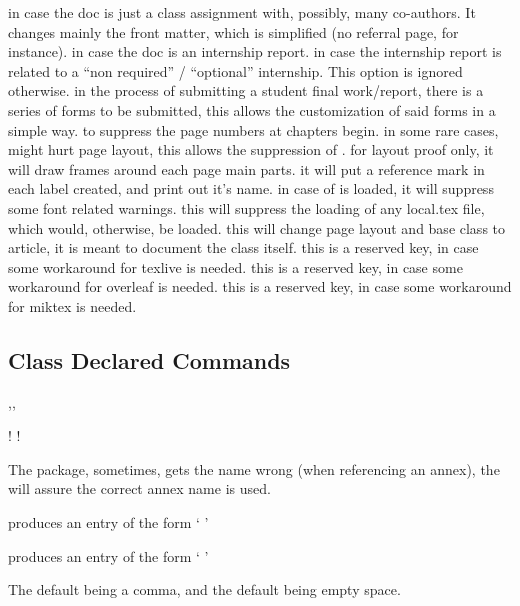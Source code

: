 \documentclass[dctools,english,tocdepth=3,secdepth=3]{ufrgscca} %
\begin{document}
\begin{Options}
	 in case the doc is just a class assignment with, possibly, many co-authors. It changes mainly the front matter, which is simplified (no referral page, for instance).
	 in case the doc is an internship report.
	 in case the internship report is related to a “non required” / “optional” internship. This option is ignored otherwise.
	 in the process of submitting a student final work/report, there is a series of forms to be submitted, this allows the customization  of said forms in a simple  way.
	 to suppress the page numbers at chapters begin.
	 in some rare cases,  might hurt page layout, this allows the suppression of .
	 for layout proof only, it will draw frames around each page main parts.
	 it will put a reference mark in each label created, and print out it's name.
	 in case of  is loaded, it will suppress some font related warnings.
	 this will suppress the loading of any local.tex file, which would, otherwise, be loaded.
	 this will change page layout and base class to article, it is meant to document the class itself.
	 this is a reserved key, in case some workaround for texlive is needed.
	 this is a reserved key, in case some workaround for overleaf is needed.
	 this is a reserved key, in case some workaround for miktex is needed.
\end{Options}

\subsection{Class Declared Commands}
\begin{Macros}{\autonameref,\annexref,\autoannexref}
	\begin{Syntax}%
		\Macro!{\autonameref}{}
		\Macro!{\autoannexref}{}
	\end{Syntax}
The  package, sometimes, gets the \Macro{\autoref}{} name wrong (when referencing an annex), the  will assure the correct annex name is used.

 produces an entry of the form `   '

 produces an entry of the form `   '

The default  being a comma, and the default  being empty space.

\end{Macros}
\end{document}
